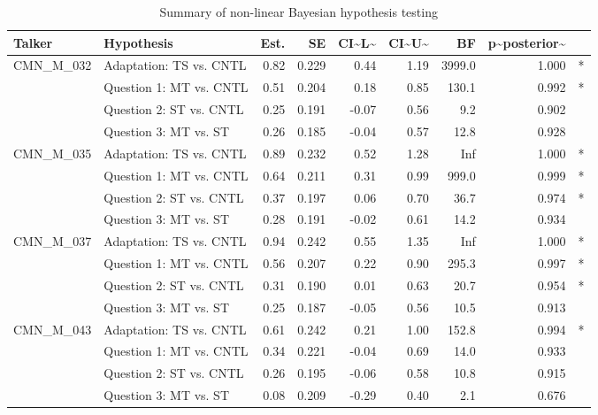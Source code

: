 \begin{table}

\caption{\label{tab:unnamed-chunk-18}Summary of non-linear Bayesian hypothesis testing}
\centering
\begin{tabular}[t]{l|l|r|r|r|r|r|r|l}
\hline
Talker & Hypothesis & Est. & SE & CI\textasciitilde{}L\textasciitilde{} & CI\textasciitilde{}U\textasciitilde{} & BF & p\textasciitilde{}posterior\textasciitilde{} & \\
\hline
CMN\_M\_032 & Adaptation: TS vs. CNTL & 0.82 & 0.229 & 0.44 & 1.19 & 3999.0 & 1.000 & *\\
\hline
 & Question 1: MT vs. CNTL & 0.51 & 0.204 & 0.18 & 0.85 & 130.1 & 0.992 & *\\
\hline
 & Question 2: ST vs. CNTL & 0.25 & 0.191 & -0.07 & 0.56 & 9.2 & 0.902 & \\
\hline
 & Question 3: MT vs. ST & 0.26 & 0.185 & -0.04 & 0.57 & 12.8 & 0.928 & \\
\hline
CMN\_M\_035 & Adaptation: TS vs. CNTL & 0.89 & 0.232 & 0.52 & 1.28 & Inf & 1.000 & *\\
\hline
 & Question 1: MT vs. CNTL & 0.64 & 0.211 & 0.31 & 0.99 & 999.0 & 0.999 & *\\
\hline
 & Question 2: ST vs. CNTL & 0.37 & 0.197 & 0.06 & 0.70 & 36.7 & 0.974 & *\\
\hline
 & Question 3: MT vs. ST & 0.28 & 0.191 & -0.02 & 0.61 & 14.2 & 0.934 & \\
\hline
CMN\_M\_037 & Adaptation: TS vs. CNTL & 0.94 & 0.242 & 0.55 & 1.35 & Inf & 1.000 & *\\
\hline
 & Question 1: MT vs. CNTL & 0.56 & 0.207 & 0.22 & 0.90 & 295.3 & 0.997 & *\\
\hline
 & Question 2: ST vs. CNTL & 0.31 & 0.190 & 0.01 & 0.63 & 20.7 & 0.954 & *\\
\hline
 & Question 3: MT vs. ST & 0.25 & 0.187 & -0.05 & 0.56 & 10.5 & 0.913 & \\
\hline
CMN\_M\_043 & Adaptation: TS vs. CNTL & 0.61 & 0.242 & 0.21 & 1.00 & 152.8 & 0.994 & *\\
\hline
 & Question 1: MT vs. CNTL & 0.34 & 0.221 & -0.04 & 0.69 & 14.0 & 0.933 & \\
\hline
 & Question 2: ST vs. CNTL & 0.26 & 0.195 & -0.06 & 0.58 & 10.8 & 0.915 & \\
\hline
 & Question 3: MT vs. ST & 0.08 & 0.209 & -0.29 & 0.40 & 2.1 & 0.676 & \\
\hline
\end{tabular}
\end{table}
